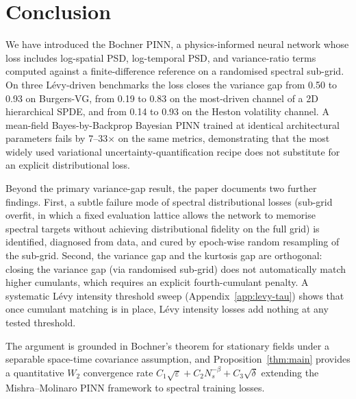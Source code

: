 \documentclass[review,12pt]{elsarticle}
\begin{document}
\section{Conclusion}
\label{sec:conclusion}

We have introduced the Bochner PINN, a physics-informed neural
network whose loss includes log-spatial PSD, log-temporal PSD,
and variance-ratio terms computed against a finite-difference
reference on a randomised spectral sub-grid. On three L\'evy-driven
benchmarks the loss closes the variance gap from 0.50 to 0.93 on
Burgers-VG, from 0.19 to 0.83 on the most-driven channel of a
2D hierarchical SPDE, and from 0.14 to 0.93 on the Heston
volatility channel. A mean-field Bayes-by-Backprop Bayesian PINN
trained at identical architectural parameters fails by
7--33\(\times\) on the same metrics, demonstrating that the most
widely used variational uncertainty-quantification recipe does
not substitute for an explicit distributional loss.

Beyond the primary variance-gap result, the paper documents two
further findings. First, a subtle failure mode of spectral
distributional losses (sub-grid overfit, in which a fixed
evaluation lattice allows the network to memorise spectral targets
without achieving distributional fidelity on the full grid)
is identified, diagnosed from data, and cured by epoch-wise random
resampling of the sub-grid. Second, the variance gap and the
kurtosis gap are orthogonal: closing the variance gap (via
randomised sub-grid) does not automatically match higher cumulants,
which requires an explicit fourth-cumulant penalty. A systematic
L\'evy intensity threshold sweep (Appendix~\ref{app:levy-tau})
shows that once cumulant matching is in place, L\'evy intensity
losses add nothing at any tested threshold.

The argument is grounded in Bochner's theorem for stationary
fields under a separable space-time covariance assumption, and
Proposition~\ref{thm:main} provides a quantitative
\(W_2\) convergence rate
\(C_1\sqrt\varepsilon + C_2 N_s^{-\beta} + C_3\sqrt\delta\)
extending the Mishra--Molinaro PINN framework to spectral training
losses.
\end{document}
